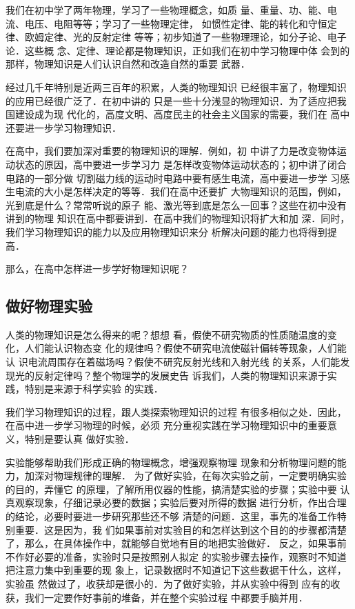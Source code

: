 我们在初中学了两年物理，学习了一些物理概念，如质
量、重量、功、能、电流、电压、电阻等等；学习了一些物理定律，
如惯性定律、能的转化和守恒定律、欧姆定律、光的反射定律
等等；初步知道了一些物理理论，如分子论、电子论．这些概
念、定律、理论都是物理知识，正如我们在初中学习物理中体
会到的那样，物理知识是人们认识自然和改造自然的重要
武器．

经过几千年特别是近两三百年的积累，人类的物理知识
已经很丰富了，物理知识的应用已经很广泛了．在初中讲的
只是一些十分浅显的物理知识．为了适应把我国建设成为现
代化的，高度文明、高度民主的社会主义国家的需要，我们在
高中还要进一步学习物理知识．

    在高中，我们要加深对重要的物理知识的理解．例如，初
中讲了力是改变物体运动状态的原因，高中要进一步学习力
是怎样改变物体运动状态的；初中讲了闭合电路的一部分做
切割磁力线的运动时电路中要有感生电流，高中要进一步学
习感生电流的大小是怎样决定的等等．我们在高中还要扩
大物理知识的范围，例如，光到底是什么？常常听说的原子
能、激光等到底是怎么一回事？这些在初中没有讲到的物理
知识在高中都要讲到．在高中我们的物理知识将扩大和加
深．同时，我们学习物理知识的能力以及应用物理知识来分
析解决问题的能力也将得到提高．

    那么，在高中怎样进一步学好物理知识呢？

\subsection*{做好物理实验}
人类的物理知识是怎么得来的呢？想想
看，假使不研究物质的性质随温度的变化，人们能认识物态变
化的规律吗？假使不研究电流使磁针偏转等现象，人们能认
识电流周围存在着磁场吗？假使不研究反射光线和入射光线
的关系，人们能发现光的反射定律吗？整个物理学的发展史告
诉我们，人类的物理知识来源于实践，特别是来源于科学实验
的实践．

    我们学习物理知识的过程，跟人类探索物理知识的过程
有很多相似之处．因此，在高中进一步学习物理的时候，必须
充分重视实践在学习物理知识中的重要意义，特别是要认真
做好实验．

    实验能够帮助我们形成正确的物理概念，增强观察物理
现象和分析物理问题的能力，加深对物理规律的理解．
为了做好实验，在每次实验之前，一定要明确实验的目的，弄懂它
的原理，了解所用仪器的性能，搞清楚实验的步骤；实验中要
认真观察现象，仔细记录必要的数据；实验后要对所得的数据
进行分析，作出合理的结论，必要时要进一步研究那些还不够
清楚的问题．这里，事先的准备工作特别重要．这是因为，我
们如果事前对实验目的和怎样达到这个目的的步骤都清楚
了，那么，在具体操作中，就能够自觉地有目的地把实验做好．
反之，如果事前不作好必要的准备，实验时只是按照别人拟定
的实验步骤去操作，观察时不知道把注意力集中到重要的现
象上，记录数据时不知道记下这些数据干什么，这样，实验虽
然做过了，收获却是很小的．为了做好实验，并从实验中得到
应有的收获，我们一定要作好事前的堆备，并在整个实验过程
中都要手脑并用．

